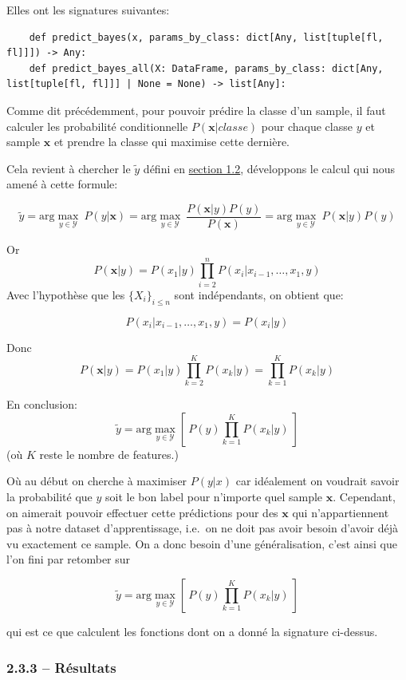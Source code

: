 \documentclass[
]{article}
\begin{document}
Elles ont les signatures suivantes:

\begin{lstlisting}
    def predict_bayes(x, params_by_class: dict[Any, list[tuple[fl, fl]]]) -> Any:
    def predict_bayes_all(X: DataFrame, params_by_class: dict[Any, list[tuple[fl, fl]]] | None = None) -> list[Any]:
\end{lstlisting}

Comme dit précédemment, pour pouvoir prédire la classe d'un sample, il
faut calculer les probabilité conditionnelle \(P(\mathbf{x}| classe)\)
pour chaque classe \(y\) et sample \(\mathbf{x}\) et prendre la classe
qui maximise cette dernière.

Cela revient à chercher le \(\tilde{y}\) défini en
\href{#naive-bayes}{section 1.2}, développons le calcul qui nous amené à
cette formule:

\[
\tilde{y}  = \text{arg}\max_{y \in \mathcal{Y}}\ P(y|\mathbf{x}) = \text{arg}\max_{y \in \mathcal{Y}}\ \frac{P(\mathbf{x}|y)  P(y)}{P(\mathbf{x})} =  \text{arg}\max_{y \in \mathcal{Y}}\ P(\mathbf{x}| y)P(y)
\]

Or \[ 
P(\mathbf{x}| y) = P(x_1 | y) \prod_{i = 2}^{n}{P(x_i | x_{i-1}, \ldots, x_1, y)}
\] Avec l'hypothèse que les \(\{X_i\}_{i \leq n}\) sont indépendants, on
obtient que:

\[P(x_i | x_{i-1}, \ldots, x_1, y) = P(x_i | y)\]

Donc
\[P(\mathbf{x}|y) = P(x_1 | y) \prod_{k = 2}^{K}{P(x_k | y)} = \prod_{k=1}^K{P(x_k | y)}\]

En conclusion:
\[ \tilde{y} = \text{arg}\max_{y \in \mathcal{Y}} \left[\  P(y) \prod_{k = 1}^K{P(x_k | y)}\  \right] \]
(où \(K\) reste le nombre de features.)

Où au début on cherche à maximiser \(P(y | x)\) car idéalement on
voudrait savoir la probabilité que \(y\) soit le bon label pour
n'importe quel sample \(\mathbf{x}\). Cependant, on aimerait pouvoir
effectuer cette prédictions pour des \(\mathbf{x}\) qui n'appartiennent
pas à notre dataset d'apprentissage, i.e.~on ne doit pas avoir besoin
d'avoir déjà vu exactement ce sample. On a donc besoin d'une
généralisation, c'est ainsi que l'on fini par retomber sur

\[ \tilde{y} = \text{arg}\max_{y \in \mathcal{Y}} \left[\  P(y) \prod_{k = 1}^K{P(x_k | y)}\  \right] \]

qui est ce que calculent les fonctions dont on a donné la signature
ci-dessus.

\hypertarget{ruxe9sultats-1}{%
\subsubsection{2.3.3 -- Résultats}\label{ruxe9sultats-1}}
\end{document}
